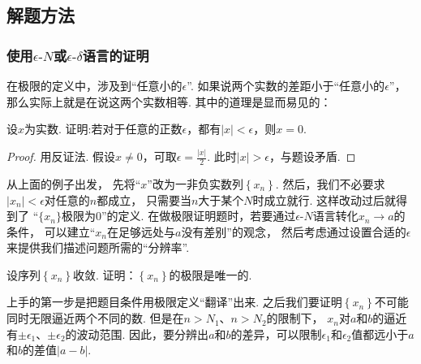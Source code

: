 \subsection{解题方法}
\subsubsection{使用$\epsilon\text{-}N$或$\epsilon\text{-}\delta$语言的证明}\par

在极限的定义中，涉及到“任意小的$\epsilon$”.
如果说两个实数的差距小于“任意小的$\epsilon$”，
那么实际上就是在说这两个实数相等.
其中的道理是显而易见的：

\begin{example}
\label{ex:ch01-01}
设$x$为实数. 证明:若对于任意的正数$\epsilon$，都有$|x|<\epsilon$，则$x=0$.
\end{example}

\begin{proof}
用反证法. 假设$x \ne 0$，可取$\epsilon=\displaystyle\frac{|x|}{2}$. 此时$|x|>\epsilon$，与题设矛盾.
\end{proof}

从上面的例子出发，
先将“$x$”改为一非负实数列$\left \{ x_{n}\right \}$.
然后，我们不必要求$|x_{n}|<\epsilon$对任意的$n$都成立，
只需要当$n$大于某个$N$时成立就行.
这样改动过后就得到了
“$\{ x_n \}$极限为$0$”的定义.
在做极限证明题时，若要通过$\epsilon\text{-}N$语言转化$x_{n}\to a$的条件，
可以建立“$x_{n}$在足够远处与$a$没有差别”的观念，
然后考虑通过设置合适的$\epsilon$来提供我们描述问题所需的“分辨率”.

\begin{example}
\label{ex:ch01-02}
设序列$\left \{ x_{n}\right \}$收敛. 证明：$\left \{ x_{n}\right \}$的极限是唯一的.
\end{example}

\begin{analysis}
上手的第一步是把题目条件用极限定义“翻译”出来.
    之后我们要证明$\left \{ x_{n}\right \}$不可能同时无限逼近两个不同的数.
    但是在$n>N_{1}$、$n>N_{2}$的限制下，
    $x_{n}$对$a$和$b$的逼近有$\pm \epsilon_{1}$、$\pm \epsilon_{2}$的波动范围.
    因此，要分辨出$a$和$b$的差异，可以限制$\epsilon_1$和$\epsilon_2$值都远小于$a$和$b$的差值$|a-b|$.
\end{analysis}

